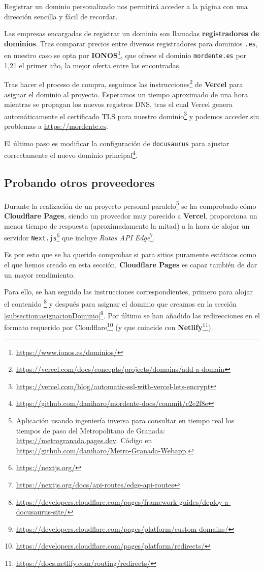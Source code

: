 Registrar un dominio personalizado nos permitirá acceder a la página con una dirección sencilla y fácil de recordar. 

Las empresas encargadas de registrar un dominio son llamadas \textbf{registradores de dominios}. Tras comparar precios entre diversos registradores para dominios \texttt{.es}, en nuestro caso se opta por \textbf{IONOS}\footnote{\url{https://www.ionos.es/dominios/}}, que ofrece el dominio \texttt{mordente.es} por 1,21\texteuro{} el primer año, la mejor oferta entre las encontradas.

Tras hacer el proceso de compra, seguimos las instrucciones\footnote{\url{https://vercel.com/docs/concepts/projects/domains/add-a-domain}} de \textbf{Vercel} para asignar el dominio al proyecto. Esperamos un tiempo aproximado de una hora mientras se propagan los nuevos registros DNS, tras el cual Vercel genera automáticamente el certificado TLS para nuestro dominio\footnote{\url{https://vercel.com/blog/automatic-ssl-with-vercel-lets-encrypt}} y podemos acceder sin problemas a \url{https://mordente.es}.

El último paso es modificar la configuración de \texttt{docusaurus} para ajustar correctamente el nuevo dominio principal\footnote{\url{https://github.com/daniharo/mordente-docs/commit/c2e2f8e}}.

\subsection{Probando otros proveedores}

Durante la realización de un proyecto personal paralelo\footnote{Aplicación usando ingeniería inversa para consultar en tiempo real los tiempos de paso del Metropolitano de Granada: \url{https://metrogranada.pages.dev}. Código en \url{https://github.com/daniharo/Metro-Granada-Webapp}.} se ha comprobado cómo \textbf{Cloudflare Pages}, siendo un proveedor muy parecido a \textbf{Vercel}, proporciona un menor tiempo de respuesta (aproximadamente la mitad) a la hora de alojar un servidor \texttt{Next.js}\footnote{\url{https://nextjs.org/}} que incluye \textit{Rutas API Edge}\footnote{\url{https://nextjs.org/docs/api-routes/edge-api-routes}}.


Es por esto que se ha querido comprobar si para sitios puramente estáticos como el que hemos creado en esta sección, \textbf{Cloudflare Pages} es capaz también de dar un mayor rendimiento.

Para ello, se han seguido las instrucciones correspondientes, primero para alojar el contenido \footnote{\url{https://developers.cloudflare.com/pages/framework-guides/deploy-a-docusaurus-site/}} y después para asignar el dominio que creamos en la sección \ref{subsection:asignacionDominio}\footnote{\url{https://developers.cloudflare.com/pages/platform/custom-domains/}}. Por último se han añadido las redirecciones en el formato requerido por Cloudflare\footnote{\url{https://developers.cloudflare.com/pages/platform/redirects/}} (y que coincide con \textbf{Netlify}\footnote{\url{https://docs.netlify.com/routing/redirects/}}).


